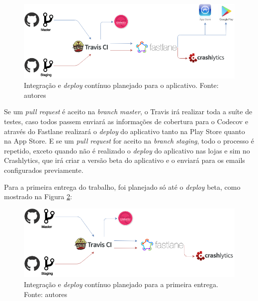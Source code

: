 \begin{figure}[H]
    \centering
    \includegraphics[scale=0.5]{figuras/ci_should_be.png}
    \caption[Integração e \textit{deploy} contínuo planejado para o aplicativo]{Integração e \textit{deploy} contínuo planejado para o aplicativo. Fonte: autores}
    \label{img:integracao_deploy_continuo_planejado_app}
\end{figure}

Se um \textit{pull request} é aceito na \textit{branch} \textit{master}, o Travis irá realizar toda a suíte de testes, caso todos passem enviará as informações de cobertura para o
Codecov e através do Fastlane realizará o \textit{deploy} do aplicativo tanto na Play Store quanto na App Store. E se um \textit{pull request} for aceito na \textit{branch} \textit{staging}, todo o processo é repetido, exceto quando não é realizado o \textit{deploy} do aplicativo nas lojas e sim no Crashlytics, que irá criar a versão beta do aplicativo e o enviará para os emails configurados previamente.

Para a primeira entrega do trabalho, foi planejado só até o \textit{deploy} beta, como mostrado na Figura \ref{img:integracao_deploy_continuo_planejado_primeira_entrega}:

\begin{figure}[H]
    \centering
    \includegraphics[scale=0.5]{figuras/ci_as_is.png}
    \caption[Integração e \textit{deploy} contínuo planejado para a primeira entrega]{Integração e \textit{deploy} contínuo planejado para a primeira entrega. Fonte: autores}
    \label{img:integracao_deploy_continuo_planejado_primeira_entrega}
\end{figure}

